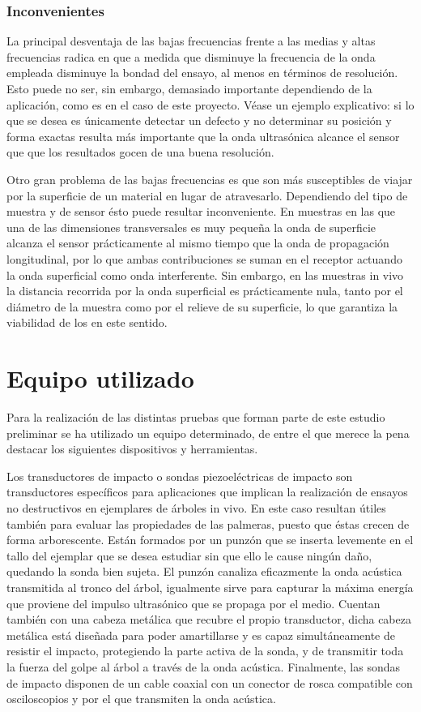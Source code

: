 \subsubsection{Inconvenientes}

La principal desventaja de las bajas frecuencias frente a las medias y
altas frecuencias radica en que a medida que disminuye la frecuencia de la
onda empleada disminuye la bondad del ensayo, al menos en términos de
resolución. Esto puede no ser, sin embargo, demasiado importante
dependiendo de la aplicación, como es en el caso de este proyecto. Véase un
ejemplo explicativo: si lo que se desea es únicamente detectar un defecto y
no determinar su posición y forma exactas resulta más importante que la
onda ultrasónica alcance el sensor que que los resultados gocen de una
buena resolución.

Otro gran problema de las bajas frecuencias es que son más susceptibles de
viajar por la superficie de un material en lugar de atravesarlo.
Dependiendo del tipo de muestra y de sensor ésto puede resultar
inconveniente. En muestras en las que una de las dimensiones transversales
es muy pequeña la onda de superficie alcanza el sensor prácticamente al
mismo tiempo que la onda de propagación longitudinal, por lo que ambas
contribuciones se suman en el receptor actuando la onda superficial como
onda interferente. Sin embargo, en las muestras in vivo la distancia
recorrida por la onda superficial es prácticamente nula, tanto por el
diámetro de la muestra como por el relieve de su superficie, lo que
garantiza la viabilidad de los  en este sentido.


\section{Equipo utilizado}

Para la realización de las distintas pruebas que forman parte de este
estudio preliminar se ha utilizado un equipo determinado, de entre el que
merece la pena destacar los siguientes dispositivos y herramientas.

Los transductores de impacto o sondas piezoeléctricas de impacto son
transductores específicos para aplicaciones que implican la realización de
ensayos no destructivos en ejemplares de árboles in vivo. En este caso
resultan útiles también para evaluar las propiedades de las palmeras,
puesto que éstas crecen de forma arborescente. Están formados por un punzón
que se inserta levemente en el tallo del ejemplar que se desea estudiar sin
que ello le cause ningún daño, quedando la sonda bien sujeta. El punzón
canaliza eficazmente la onda acústica transmitida al tronco del árbol,
igualmente sirve para capturar la máxima energía que proviene del impulso
ultrasónico que se propaga por el medio. Cuentan también con una cabeza
metálica que recubre el propio transductor, dicha cabeza metálica está
diseñada para poder amartillarse y es capaz simultáneamente de resistir el
impacto, protegiendo la parte activa de la sonda, y de transmitir toda la
fuerza del golpe al árbol a través de la onda acústica. Finalmente, las
sondas de impacto disponen de un cable coaxial con un conector de rosca
compatible con osciloscopios y por el que transmiten la onda acústica.

